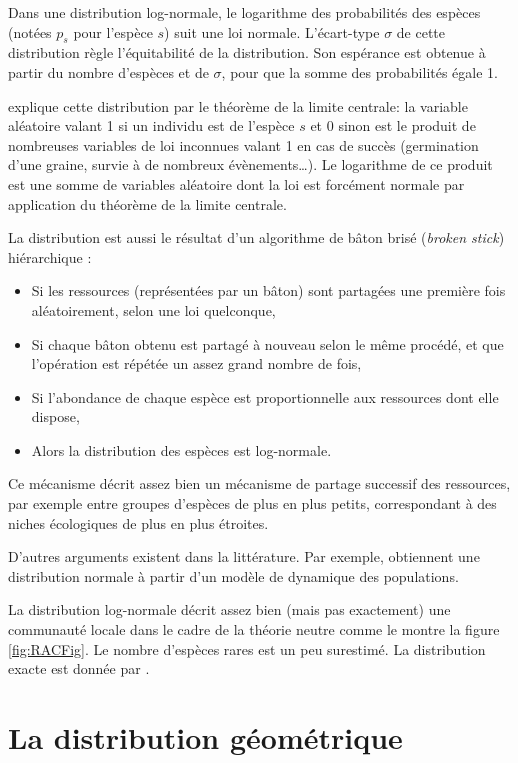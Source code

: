 \documentclass[
  11pt,
  american,
  a4paper,
  extrafontsizes,onecolumn,openright
  ]{memoir}
\providecommand{\tightlist}{%
  \setlength{\itemsep}{0pt}\setlength{\parskip}{0pt}}
\begin{document}
Dans une distribution log-normale, le logarithme des probabilités des espèces (notées \(p_s\) pour l'espèce \(s\)) suit une loi normale.
L'écart-type \(\sigma\) de cette distribution règle l'équitabilité de la distribution.
Son espérance est obtenue à partir du nombre d'espèces et de \(\sigma\), pour que la somme des probabilités égale 1.

\textcite{May1975} explique cette distribution par le théorème de la limite centrale: la variable aléatoire valant 1 si un individu est de l'espèce \(s\) et 0 sinon est le produit de nombreuses variables de loi inconnues valant 1 en cas de succès (germination d'une graine, survie à de nombreux évènements\ldots).
Le logarithme de ce produit est une somme de variables aléatoire dont la loi est forcément normale par application du théorème de la limite centrale.

La distribution est aussi le résultat d'un algorithme de bâton brisé (\emph{broken stick}) hiérarchique \autocite{Bulmer1974}:

\begin{itemize}
\tightlist
\item
  Si les ressources (représentées par un bâton) sont partagées une première fois aléatoirement, selon une loi quelconque,
\item
  Si chaque bâton obtenu est partagé à nouveau selon le même procédé, et que l'opération est répétée un assez grand nombre de fois,
\item
  Si l'abondance de chaque espèce est proportionnelle aux ressources dont elle dispose,
\item
  Alors la distribution des espèces est log-normale.
\end{itemize}

Ce mécanisme décrit assez bien un mécanisme de partage successif des ressources, par exemple entre groupes d'espèces de plus en plus petits, correspondant à des niches écologiques de plus en plus étroites.

D'autres arguments existent dans la littérature.
Par exemple, \textcite{Engen1996} obtiennent une distribution normale à partir d'un modèle de dynamique des populations.

La distribution log-normale décrit assez bien (mais pas exactement) une communauté locale dans le cadre de la théorie neutre \autocite{Hubbell2001} comme le montre la figure \ref{fig:RACFig}.
Le nombre d'espèces rares est un peu surestimé.
La distribution exacte est donnée par \textcite{Volkov2003}.

\section{La distribution géométrique}\label{la-distribution-guxe9omuxe9trique}
\end{document}
